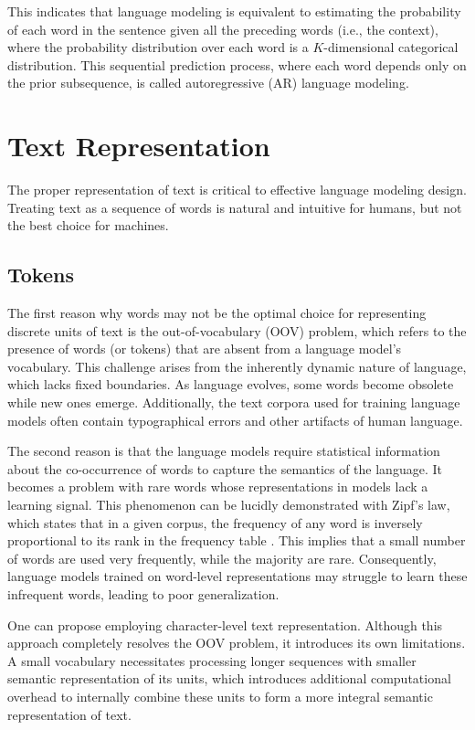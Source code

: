 This indicates that language modeling is equivalent to estimating the probability of each word in the sentence given all the preceding words (i.e., the context), where the probability distribution over each word is a \(K\)-dimensional categorical distribution. This sequential prediction process, where each word depends only on the prior subsequence, is called autoregressive (AR) language modeling.

\section{Text Representation}

The proper representation of text is critical to effective language modeling design. Treating text as a sequence of words is natural and intuitive for humans, but not the best choice for machines.

\subsection{Tokens}\label{sec:tokens}

The first reason why words may not be the optimal choice for representing discrete units of text is the out-of-vocabulary (OOV) problem, which refers to the presence of words (or tokens) that are absent from a language model's vocabulary. This challenge arises from the inherently dynamic nature of language, which lacks fixed boundaries. As language evolves, some words become obsolete while new ones emerge. Additionally, the text corpora used for training language models often contain typographical errors and other artifacts of human language.

The second reason is that the language models require statistical information about the co-occurrence of words to capture the semantics of the language. It becomes a problem with rare words whose representations in models lack a learning signal. This phenomenon can be lucidly demonstrated with Zipf's law, which states that in a given corpus, the frequency of any word is inversely proportional to its rank in the frequency table \parencite{estoup1916}. This implies that a small number of words are used very frequently, while the majority are rare. Consequently, language models trained on word-level representations may struggle to learn these infrequent words, leading to poor generalization.

One can propose employing character-level text representation. Although this approach completely resolves the OOV problem, it introduces its own limitations. A small vocabulary necessitates processing longer sequences with smaller semantic representation of its units, which introduces additional computational overhead to internally combine these units to form a more integral semantic representation of text.

